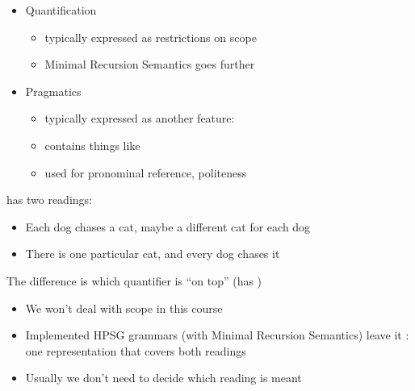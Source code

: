 \documentclass[a4paper,landscape,headrule,footrule]{foils}
\begin{document}


\begin{itemize}
\item Quantification
  \begin{itemize}
  \item typically expressed as restrictions on scope
  \item Minimal Recursion Semantics goes further
  \end{itemize}
\item Pragmatics
  \begin{itemize}
  \item typically expressed as another feature: 
  \item contains things like 
  \item used for pronominal reference, politeness
\end{itemize}
\end{itemize}

 has two readings:
\begin{itemize}
\item Each dog chases a cat, maybe a different cat for each dog
\item There is one particular cat, and every dog chases it
\end{itemize}
The difference is which quantifier is ``on top'' (has )

\begin{itemize}
\item We won't deal with scope in this course
\item Implemented HPSG grammars (with Minimal Recursion Semantics)
  leave it : one representation that covers both
  readings
\item Usually we don't need to decide which reading is meant
\end{itemize}
\end{document}
